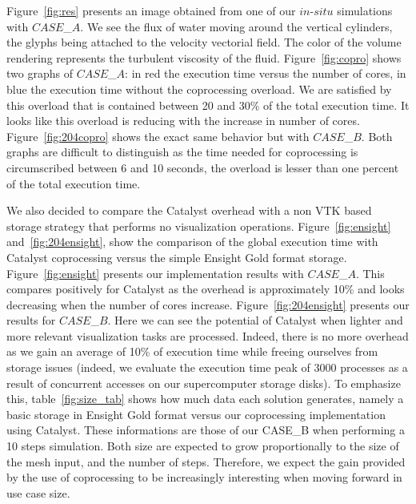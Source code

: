 Figure~\ref{fig:res} presents an image obtained from one of our $in$-$situ$
simulations with $CASE$\_$A$.
We see the flux of water moving around the vertical cylinders, the glyphs being attached 
to the velocity vectorial field. The color of the volume rendering represents 
the turbulent viscosity of the fluid. Figure~\ref{fig:copro} shows two graphs of
$CASE$\_$A$: in red the execution 
time versus the number of cores, in blue the execution time without
the coprocessing overload. We are satisfied by this overload that is contained
between 20 and 30\% of the total execution time. 
It looks like this overload is reducing with the increase in number of cores. 
Figure~\ref{fig:204copro} shows the exact same behavior but with $CASE$\_$B$. Both
graphs are difficult to distinguish as the time needed for coprocessing is
circumscribed between 6 and 10 seconds, the overload is lesser than one
percent of the total execution time.

We also decided to compare the Catalyst overhead with a non VTK based 
storage strategy that performs no visualization operations. Figure~\ref{fig:ensight} and~\ref{fig:204ensight}, 
show the comparison of the global execution time with Catalyst coprocessing
versus the simple Ensight Gold format storage. Figure~\ref{fig:ensight} presents
our implementation results with $CASE$\_$A$. This compares positively for Catalyst as the overhead
is approximately 10\% and looks decreasing when the number of cores increase.
Figure~\ref{fig:204ensight} presents our results for $CASE$\_$B$. Here we can see the potential of Catalyst when 
lighter and more relevant visualization tasks are processed. Indeed, there is no more 
overhead as we gain an average of 10\% of execution time while freeing
ourselves from storage issues (indeed, we evaluate the execution time peak of
3000 processes as a result of concurrent accesses on our 
supercomputer storage
disks). To emphasize this, table~\ref{fig:size_tab} shows how much data each
solution generates, namely a basic storage in Ensight Gold format versus our
coprocessing implementation using Catalyst. These informations are those of our
CASE\_B when performing a 10 steps simulation. Both size are
expected to grow proportionally to the size of the mesh input, and the number of
steps. Therefore, we expect the gain provided by the use of coprocessing 
to be
increasingly interesting when moving forward in use case size.

